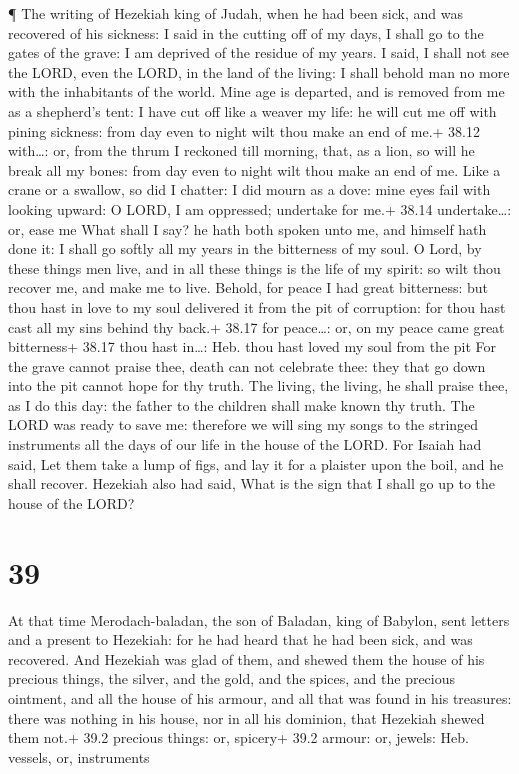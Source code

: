  ¶ The writing of Hezekiah king of Judah, when he had been
sick, and was recovered of his sickness:  I said in the
cutting off of my days, I shall go to the gates of the grave: I am
deprived of the residue of my years.  I said, I shall not
see the LORD, even the LORD, in the land of the living: I shall behold
man no more with the inhabitants of the world.  Mine age is
departed, and is removed from me as a shepherd's tent: I have cut off
like a weaver my life: he will cut me off with pining sickness: from day
even to night wilt thou make an end of me.+ 38.12 with\ldots: or, from
the thrum  I reckoned till morning, that, as a lion, so
will he break all my bones: from day even to night wilt thou make an end
of me.  Like a crane or a swallow, so did I chatter: I did
mourn as a dove: mine eyes fail with looking upward: O LORD, I am
oppressed; undertake for me.+ 38.14 undertake\ldots: or, ease me
 What shall I say? he hath both spoken unto me, and himself
hath done it: I shall go softly all my years in the bitterness of my
soul.  O Lord, by these things men live, and in all these
things is the life of my spirit: so wilt thou recover me, and make me to
live.  Behold, for peace I had great bitterness: but thou
hast in love to my soul delivered it from the pit of corruption: for
thou hast cast all my sins behind thy back.+ 38.17 for peace\ldots: or,
on my peace came great bitterness+ 38.17 thou hast in\ldots: Heb. thou
hast loved my soul from the pit  For the grave cannot
praise thee, death can not celebrate thee: they that go down into the
pit cannot hope for thy truth.  The living, the living, he
shall praise thee, as I do this day: the father to the children shall
make known thy truth.  The LORD was ready to save me:
therefore we will sing my songs to the stringed instruments all the days
of our life in the house of the LORD.  For Isaiah had said,
Let them take a lump of figs, and lay it for a plaister upon the boil,
and he shall recover.  Hezekiah also had said, What is the
sign that I shall go up to the house of the LORD?

\hypertarget{section-38}{%
\section{39}\label{section-38}}

 At that time Merodach-baladan, the son of Baladan, king of
Babylon, sent letters and a present to Hezekiah: for he had heard that
he had been sick, and was recovered.  And Hezekiah was glad
of them, and shewed them the house of his precious things, the silver,
and the gold, and the spices, and the precious ointment, and all the
house of his armour, and all that was found in his treasures: there was
nothing in his house, nor in all his dominion, that Hezekiah shewed them
not.+ 39.2 precious things: or, spicery+ 39.2 armour: or, jewels: Heb.
vessels, or, instruments

